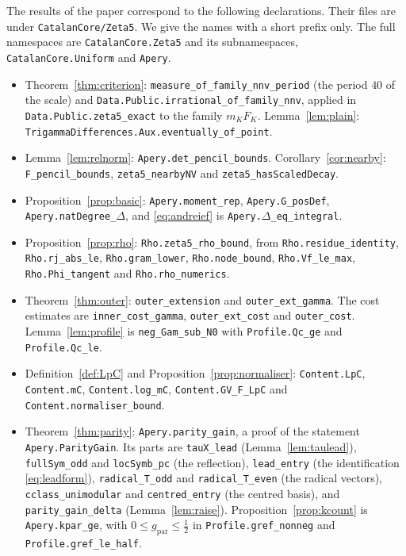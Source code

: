 \documentclass[11pt]{amsart}
\theoremstyle{definition}
\theoremstyle{remark}
\numberwithin{equation}{section}
\newcommand{\lean}[1]{\nolinkurl{#1}}
\newcommand{\gref}{g_{\mathrm{par}}}
\begin{document}
The results of the paper correspond to the following declarations. Their files are under
\lean{CatalanCore/Zeta5}. We give the names with a short prefix only. The full namespaces are
\lean{CatalanCore.Zeta5} and its subnamespaces, \lean{CatalanCore.Uniform} and \lean{Apery}.
\begin{itemize}
\item Theorem~\ref{thm:criterion}: \lean{measure_of_family_nnv_period} (the period $40$ of the scale) and
 \lean{Data.Public.irrational_of_family_nnv}, applied in \lean{Data.Public.zeta5_exact} to the family $m_KF_K$.
 Lemma~\ref{lem:plain}: \lean{TrigammaDifferences.Aux.eventually_of_point}.
\item Lemma~\ref{lem:relnorm}: \lean{Apery.det_pencil_bounds}. Corollary~\ref{cor:nearby}: \lean{F_pencil_bounds},
 \lean{zeta5_nearbyNV} and \lean{zeta5_hasScaledDecay}.
\item Proposition~\ref{prop:basic}: \lean{Apery.moment_rep}, \lean{Apery.G_posDef}, \lean{Apery.natDegree_}$\Delta$, and
 \eqref{eq:andreief} is \lean{Apery.}$\Delta$\lean{_eq_integral}.
\item Proposition~\ref{prop:rho}: \lean{Rho.zeta5_rho_bound}, from \lean{Rho.residue_identity},
 \lean{Rho.rj_abs_le}, \lean{Rho.gram_lower}, \lean{Rho.node_bound}, \lean{Rho.Vf_le_max},
 \lean{Rho.Phi_tangent} and \lean{Rho.rho_numerics}.
\item Theorem~\ref{thm:outer}: \lean{outer_extension} and \lean{outer_ext_gamma}. The cost estimates are \lean{inner_cost_gamma},
 \lean{outer_ext_cost} and \lean{outer_cost}. Lemma~\ref{lem:profile} is \lean{neg_Gam_sub_N0} with
 \lean{Profile.Qc_ge} and \lean{Profile.Qc_le}.
\item Definition~\ref{def:LpC} and Proposition~\ref{prop:normaliser}: \lean{Content.LpC}, \lean{Content.mC},
 \lean{Content.log_mC}, \lean{Content.GV_F_LpC} and \lean{Content.normaliser_bound}.
\item Theorem~\ref{thm:parity}: \lean{Apery.parity_gain}, a proof of the statement \lean{Apery.ParityGain}. Its parts
 are \lean{tauX_lead} (Lemma~\ref{lem:taulead}), \lean{fullSym_odd} and \lean{locSymb_pc} (the reflection),
 \lean{lead_entry} (the identification \eqref{eq:leadform}), \lean{radical_T_odd} and \lean{radical_T_even} (the
 radical vectors), \lean{cclass_unimodular} and \lean{centred_entry} (the centred basis), and
 \lean{parity_gain_delta} (Lemma~\ref{lem:raise}). Proposition~\ref{prop:kcount} is \lean{Apery.kpar_ge}, with
 $0\le\gref\le\frac12$ in \lean{Profile.gref_nonneg} and \lean{Profile.gref_le_half}.

\end{itemize}
\end{document}
